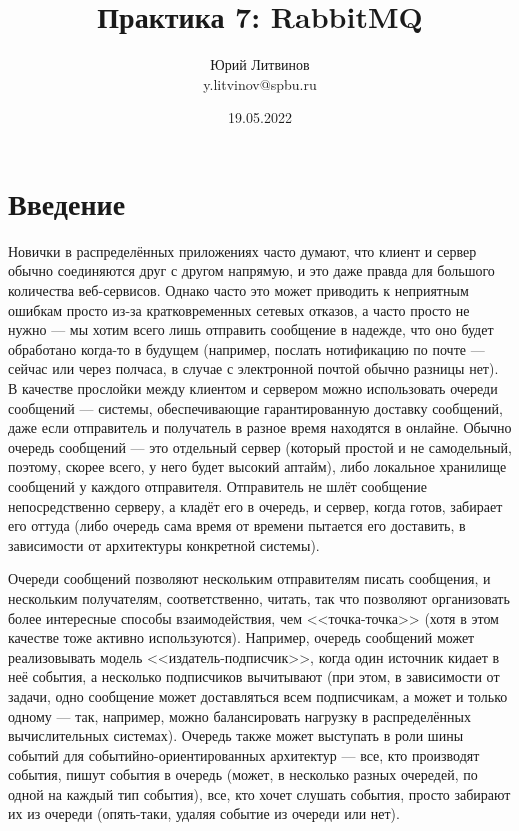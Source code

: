 \documentclass[a5paper]{article}
\title{Практика 7: RabbitMQ}
\author{Юрий Литвинов\\\small{y.litvinov@spbu.ru}}
\date{19.05.2022}
\begin{document}
\maketitle
\thispagestyle{empty}

\section{Введение}

Новички в распределённых приложениях часто думают, что клиент и сервер обычно соединяются друг с другом напрямую, и это даже правда для большого количества веб-сервисов. Однако часто это может приводить к неприятным ошибкам просто из-за кратковременных сетевых отказов, а часто просто не нужно --- мы хотим всего лишь отправить сообщение в надежде, что оно будет обработано когда-то в будущем (например, послать нотификацию по почте --- сейчас или через полчаса, в случае с электронной почтой обычно разницы нет). В качестве прослойки между клиентом и сервером можно использовать очереди сообщений --- системы, обеспечивающие гарантированную доставку сообщений, даже если отправитель и получатель в разное время находятся в онлайне. Обычно очередь сообщений --- это отдельный сервер (который простой и не самодельный, поэтому, скорее всего, у него будет высокий аптайм), либо локальное хранилище сообщений у каждого отправителя. Отправитель не шлёт сообщение непосредственно серверу, а кладёт его в очередь, и сервер, когда готов, забирает его оттуда (либо очередь сама время от времени пытается его доставить, в зависимости от архитектуры конкретной системы).

Очереди сообщений позволяют нескольким отправителям писать сообщения, и нескольким получателям, соответственно, читать, так что позволяют организовать более интересные способы взаимодействия, чем <<точка-точка>> (хотя в этом качестве тоже активно используются). Например, очередь сообщений может реализовывать модель <<издатель-подписчик>>, когда один источник кидает в неё события, а несколько подписчиков вычитывают (при этом, в зависимости от задачи, одно сообщение может доставляться всем подписчикам, а может и только одному --- так, например, можно балансировать нагрузку в распределённых вычислительных системах). Очередь также может выступать в роли шины событий для событийно-ориентированных архитектур --- все, кто производят события, пишут события в очередь (может, в несколько разных очередей, по одной на каждый тип события), все, кто хочет слушать события, просто забирают их из очереди (опять-таки, удаляя событие из очереди или нет).
\end{document}
